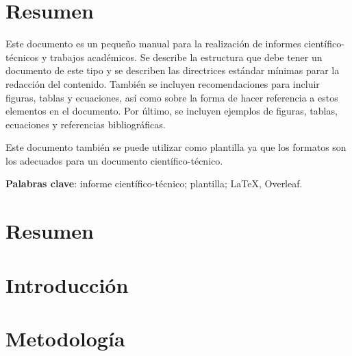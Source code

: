 \documentclass[11pt]{article}
\begin{document}





{}
\section*{Resumen}

Este documento es un pequeño manual para la realización de informes científico-técnicos y trabajos académicos. Se describe la estructura que debe tener un documento de este tipo y se describen las directrices estándar mínimas parar la redacción del contenido. También se incluyen recomendaciones para incluir figuras, tablas y ecuaciones, así como sobre la forma de hacer referencia a estos elementos en el documento. Por último, se incluyen ejemplos de figuras, tablas, ecuaciones y referencias bibliográficas.

Este documento también se puede utilizar como plantilla ya que los formatos son los adecuados para un documento científico-técnico.

\textbf{Palabras clave}: informe científico-técnico; plantilla; \LaTeX, Overleaf.


\section*{Resumen}


\section{Introducción}


\section{Metodología}
\end{document}
